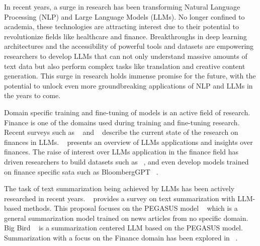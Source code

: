 In recent years, a surge in research has been transforming Natural Language Processing (NLP) and Large Language Models
(LLMs).
No longer confined to academia, these technologies are attracting interest due to their potential to revolutionize fields
like healthcare and finance.
Breakthroughs in deep learning architectures and the accessibility of powerful tools and datasets are empowering
researchers to develop LLMs that can not only understand massive amounts of text data but also perform complex tasks
like translation and creative content generation.
This surge in research holds immense promise for the future, with the potential to unlock even more groundbreaking
applications of NLP and LLMs in the years to come.

Domain specific training and fine-tuning of models is an active field of research.
Finance is one of the domains used during training and fine-tuning research.
Recent surveys such as ~\cite{Lee2024} and ~\cite{Li2023} describe the current state of the research on finances in LLMs.
~\cite{Zhao2024} presents an overview of LLMs applications and insights over finances.
The raise of interest over LLMs application in the finance field has driven researchers to build datasets such as
~\cite{Dong2024, El-Haj, Sharma2023}, and even develop models trained on finance specific sata such as BloombergGPT
~\cite{Wu2023}.

The task of text summarization being achieved by LLMs has been actively researched in recent years.
~\cite{Jin2024} provides a survey on text summarization with LLM-based methods.
This proposal focuses on the PEGASUS model ~\cite{Zhang2019} which is a general summarization model trained on news
articles from no specific domain.
Big Bird ~\cite{Zaheer2020} is a summarization centered LLM based on the PEGASUS model.
Summarization with a focus on the Finance domain has been explored in ~\cite{Avramelou2023, passali-etal-2021-towards}.
